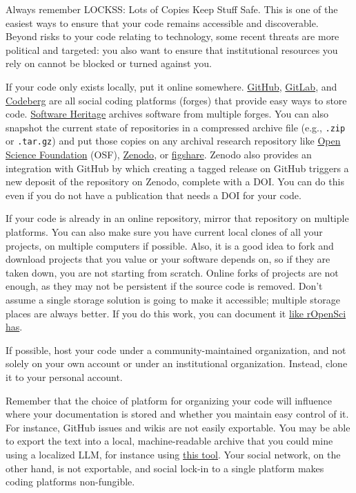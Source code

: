 \documentclass[10pt,letterpaper]{article}
\begin{document}
Always remember LOCKSS: Lots of Copies Keep Stuff Safe.
This is one of the easiest ways to ensure that your code remains accessible and discoverable.
Beyond risks to your code relating to technology,
some recent threats are more political and targeted:
you also want to ensure that institutional resources you rely on cannot be blocked or turned against you.

If your code only exists locally,
put it online somewhere.
\href{https://github.com/}{GitHub},
\href{https://gitlab.com}{GitLab},
and \href{https://codeberg.org/}{Codeberg} are all social coding platforms (forges)
that provide easy ways to store code.
\href{https://www.softwareheritage.org/how-to-archive-reference-code/}{Software Heritage}
archives software from multiple forges.
You can also snapshot the current state of repositories in a compressed archive file
(e.g., \texttt{.zip} or \texttt{.tar.gz})
and put those copies on any archival research repository like \href{https://osf.io/}{Open Science Foundation} (OSF),
\href{https://zenodo.org/}{Zenodo},
or \href{https://figshare.com/}{figshare}.
Zenodo also provides an integration with GitHub
by which creating a tagged release on GitHub triggers a new deposit of the repository on Zenodo,
complete with a DOI.
You can do this even if you do not have a publication that needs a DOI for your code.

If your code is already in an online repository,
mirror that repository on multiple platforms.
You can also make sure you have current local clones of all your projects,
on multiple computers if possible.
Also,
it is a good idea to fork and download projects that you value or your software depends on,
so if they are taken down,
you are not starting from scratch.
Online forks of projects are not enough,
as they may not be persistent if the source code is removed.
Don't assume a single storage solution is going to make it accessible;
multiple storage places are always better.
If you do this work,
you can document it
\href{https://ropensci.org/blog/2022/03/22/safeguards-and-backups-for-github-organizations/}{like rOpenSci has}.

If possible,
host your code under a community-maintained organization,
and not solely on your own account or under an institutional organization.
Instead, clone it to your personal account.

Remember that the choice of platform for organizing your code
will influence where your documentation is stored and whether you maintain easy control of it.
For instance,
GitHub issues and wikis are not easily exportable.
You may be able to export the text into a local, machine-readable archive
that you could mine using a localized LLM,
for instance using \href{https://github.com/jlord/offline-issues}{this tool}.
Your social network,
on the other hand,
is not exportable,
and social lock-in to a single platform makes coding platforms non-fungible.
\end{document}
